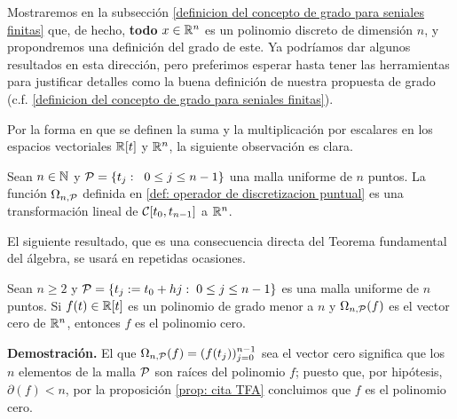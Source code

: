 

Mostraremos en la subsección
\ref{definicion del concepto de grado para seniales finitas}
que, de hecho, \textbf{todo}
$x \in \mathbb{R}^{n}$ es un polinomio discreto
de dimensión $n$,
y propondremos una definición del grado de este.
Ya podríamos dar algunos resultados en esta dirección,
pero preferimos esperar hasta tener las herramientas
para justificar detalles como la buena definición
de nuestra propuesta de grado (c.f. 
\ref{definicion del concepto de grado para seniales finitas}).


Por la forma en que se definen la suma y la multiplicación
por escalares en los espacios vectoriales $\mathbb{R}[t]$
y $\mathbb{R}^{n}$, la siguiente observación es clara.

\begin{obs} \label{obs:linealidad de omega restringida a R[x]}
Sean $n \in \mathbb{N}$ y $\mathcal{P}=\{t_{j}:
\hspace{0.2cm}0 \leq j \leq n-1 \}$ una malla uniforme
de $n$ puntos.
La función $\Omega_{n , \mathcal{P}}$ 
definida en 
\ref{def: operador de discretizacion puntual}
es una transformación lineal de 
$\mathcal{C}[t_{0}, t_{n-1}]$ a $\mathbb{R}^{n}$.
\end{obs}
 
El siguiente resultado, que es una consecuencia directa
del Teorema fundamental del álgebra, se usará en repetidas ocasiones.

\begin{prop}
\label{prop: consecuencia del TFA}
Sean $n \geq 2$ y 
$\mathcal{P}=\{ t_{j}:=t_{0}+hj : \hspace{0.1cm} 0 \leq j \leq n-1 \}$ 
es una malla uniforme de $n$ puntos.
Si $f(t) \in \mathbb{R}[t]$ es un polinomio de grado menor a $n$ y
$\Omega_{n, \mathcal{P}}(f)$ es el vector cero de $\mathbb{R}^{n}$, entonces
$f$ es el polinomio cero.
\end{prop}
\noindent
\textbf{Demostración.}
El que $\Omega_{n, \mathcal{P}}(f)=(f(t_{j}))_{j=0}^{n-1}$ sea
el vector cero significa que los $n$ elementos de la malla
$\mathcal{P}$ son raíces del polinomio $f$; puesto que, por hipótesis,
$\partial(f) < n$, por la proposición
\ref{prop: cita TFA}
concluimos que
$f$ es el polinomio cero.
\QEDB
\vspace{0.2cm}




